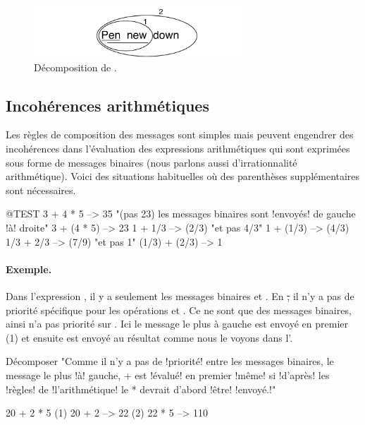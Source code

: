 \documentclass[a4paper,10pt,twoside]{book}
\begin{document}
\begin{figure}
	\centering
	\includegraphics[width=8cm]{ucompoUn}
	\caption{D\'ecomposition de .}
\end{figure}

\subsection{Incoh\'erences arithm\'etiques}
Les r\`egles de composition des messages sont simples mais peuvent
engendrer des incoh\'erences dans l'\'evaluation des expressions
arithm\'etiques qui sont exprim\'ees sous forme de messages binaires
(nous parlons aussi d'irrationnalit\'e arithm\'etique).
Voici des situations habituelles o\`u des parenth\`eses suppl\'ementaires sont n\'ecessaires.

\begin{code}{@TEST}
3 + 4 * 5      --> 35    "(pas 23)  les messages binaires sont !envoy\'es! de gauche !\`a! droite"
3 + (4 * 5)    --> 23
1 + 1/3         --> (2/3)    "et pas 4/3"
1 + (1/3)       --> (4/3)
1/3 + 2/3       --> (7/9)    "et pas 1"
(1/3) + (2/3)  --> 1
\end{code}

\paragraph{Exemple.} 
Dans l'expression , il y a seulement les messages
binaires \ct{+} et \ct{*}. En \st, il n'y a pas de priorit\'e
sp\'ecifique pour les op\'erations \ct{+} et \ct{*}. Ce ne sont que
des messages binaires, ainsi \ct{*} n'a pas priorit\'e sur \ct{+}. Ici
le message le plus \`a gauche \ct{+} est envoy\'e en premier (1) et
ensuite \ct{*} est envoy\'e au r\'esultat comme nous le voyons dans l'.  

\begin{example}[binaryMessages1]{D\'ecomposer }{}
"Comme il n'y a pas de !priorit\'e! entre les messages binaires, le message le plus !\`a! gauche, + est !\'evalu\'e! en premier !m\^eme! si !d'apr\`es! les !r\`egles! de !l'arithm\'etique! le * devrait d'abord !\^etre! !envoy\'e.!"

      20 + 2 * 5 
(1)  20 + 2 --> 22
(2)  22       * 5 --> 110
\end{example}
\end{document}
